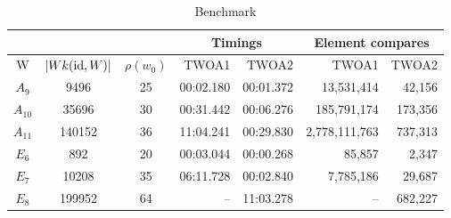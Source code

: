 \newpage

\begin{table}
	\centering
	\begin{tabular}{|c|c|c|r|r|r|r|}
	\hline
	\multicolumn{3}{|c|}{} & \multicolumn{2}{|c|}{Timings} &
	\multicolumn{2}{|c|}{Element compares}\\
	\hline
	W & $|Wk(\operatorname{id},W)|$ & $\rho(w_0)$ & TWOA1 & TWOA2 & TWOA1 & TWOA2\\
	\hline
	$A_9$ & 9496 & 25 & 00:02.180 & 00:01.372 & 13,531,414 & 42,156\\
	\hline
	$A_{10}$ & 35696 & 30 & 00:31.442 & 00:06.276 & 185,791,174 & 173,356\\
	\hline
	$A_{11}$ & 140152 & 36 & 11:04.241 & 00:29.830 & 2,778,111,763 & 737,313\\
	\hline
	$E_6$ & 892 & 20 & 00:03.044 & 00:00.268 & 85,857 & 2,347\\
	\hline
	$E_7$ & 10208 & 35 & 06:11.728 & 00:02.840 & 7,785,186 & 29,687\\
	\hline
	$E_8$ & 199952 & 64 & -- & 11:03.278 & -- & 682,227\\
	\hline
	\end{tabular}
	\caption{Benchmark}
	\label{tab:benchmark-twoa}
\end{table}